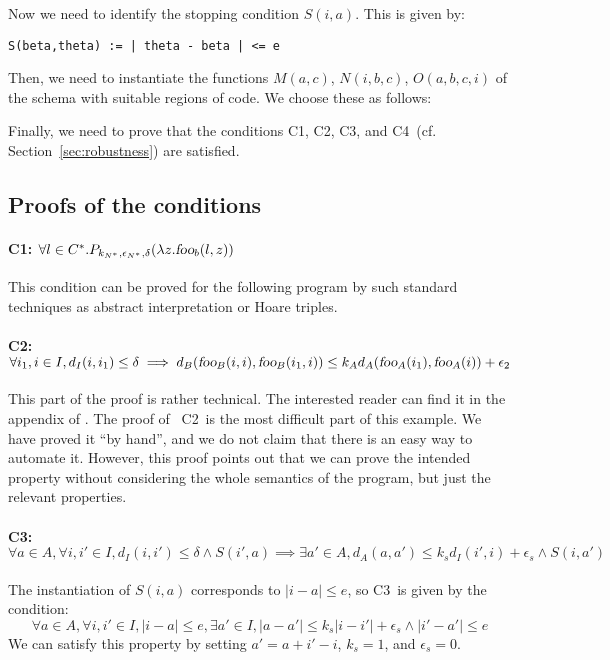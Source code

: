 \documentclass[copyright,creativecommons]{eptcs}
\newcommand{\fooA}{\hbox{\sl foo}_A}
\newcommand{\foob}{\hbox{\sl foo}_b}
\newcommand{\fooB}{\hbox{\sl foo}_B}
\newcommand{\Cone}{C1}
\newcommand{\Ctwo}{C2}
\newcommand{\Cthree}{C3}
\newcommand{\Cfour}{C4}
\newcommand{\Kn}{k_{N^*}}
\newcommand{\En}{\epsilon_{N^*}}
\newcommand{\AND}{\mathrel{\wedge}}
\begin{document}
Now we need to identify the stopping condition $S(i,a)$. This is given by:
\begin{lstlisting}
S(beta,theta) := | theta - beta | <= e
\end{lstlisting}


Then, we need to instantiate the functions $M(a,c)$, $N(i,b,c)$, $O(a,b,c,i)$ of the schema with suitable regions of code.
We choose these as follows:

{} 

Finally, we need to prove that the conditions \Cone, \Ctwo, \Cthree, and \Cfour \, (cf. Section~\ref{sec:robustness}) are satisfied. 

\subsection{Proofs of the conditions}

\paragraph{\Cone: $\forall l \in C^*. P_{\Kn,\En,\delta}(\lambda z. \foob(l,z))$}
This condition can be proved for the following program by such standard
techniques as abstract interpretation or Hoare triples.

{}


\paragraph{\Ctwo: 
$\forall i_1,i \in I, d_I(i,i_1) \leq \delta \implies
d_B( \fooB(i,i) , \fooB(i_1,i)) \leq k_A  d_A( \fooA(i_1) , \fooA(i)) + \epsilon_2$}
This part of the proof is rather technical. The interested reader can
find it in the appendix of \cite{gazeau12hal}. 
The proof of ~\Ctwo \, is the most difficult part of this example. We have proved it ``by hand'', and we do not
claim that there is an easy way to automate it.  
However, this proof points out that  we can prove
the intended property  without considering the whole semantics of the program,  but
just the relevant properties. 

\paragraph{\Cthree: $\forall a \in A, \forall i,i' \in I,
d_I(i,i') \leq \delta \AND 
S(i',a) \implies \exists a' \in A, d_A(a,a') \leq k_s d_I(i',i) + \epsilon_s \AND 
S(i,a')$}
The instantiation of $S(i,a)$ corresponds to $|i-a| \leq e$, so \Cthree\, is given by the condition:
\[\forall a \in A, \forall i,i' \in I, |i-a|\leq e, \exists a' \in I, |a-a'| \leq k_s |i-i'| + \epsilon_s \AND 
 |i'-a'|\leq e \]
We can satisfy this property by setting $a'=a+i'-i$, $k_s=1$, and
$\epsilon_s=0$.
\end{document}
